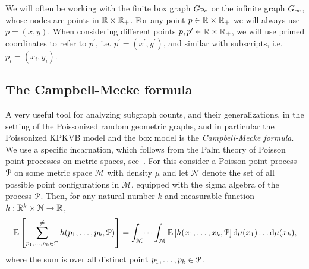 \begin{remark}
We will often be working with the finite box graph $G_{{\mathrm{Po}}}$ or the infinite graph $G_{\infty}$, whose nodes are points in ${\mathbb R} \times {\ensuremath{\mathbb R}}_+$. For any point $p \in {\ensuremath{\mathbb R}} \times {\ensuremath{\mathbb R}}_+$ we will always use $p = (x,y)$. When considering different points $p,p^\prime \in {\ensuremath{\mathbb R}} \times {\ensuremath{\mathbb R}}_+$, we will use primed coordinates to refer to $p^\prime$, i.e. $p^\prime = (x^\prime ,y^\prime)$, and similar with subscripts, i.e. $p_i = (x_i,y_i)$.
\end{remark}

\subsection{The Campbell-Mecke formula}

A very useful tool for analyzing subgraph counts, and their generalizations, in the 
setting of the Poissonized random geometric graphs, and in particular the Poissonized KPKVB model and the box model is the \emph{Campbell-Mecke formula}. We use a specific incarnation, which follows from the Palm theory of Poisson point processes on metric spaces, see~\cite{last2017lectures}. For this consider a Poisson point process ${\mathcal P}$ on some metric space $\mathcal{M}$ with density $\mu$ and let $\mathcal{N}$ denote the set of all possible point configurations in $\mathcal{M}$, equipped with the sigma algebra of the process ${\mathcal P}$. Then, for any natural number $k$ and measurable function $h : {\mathbb R}^k \times \mathcal{N} \to {\ensuremath{\mathbb R}}$,
\begin{equation}\label{eq:def_campbell_mecke}
	\mathbb{E}\left[\sum_{p_1, \dots, p_k \in {\mathcal P}}^{\ne} h(p_1, \dots, p_k, {\mathcal P})\right]
	= \int_{\mathcal{M}} \dots \int_{\mathcal{M}} \mathbb{E}\left[h(x_1,\dots, x_k, {\mathcal P}\right] \operatorname{\mathrm{d}\hspace{-2pt}} \mu(x_1) \dots \operatorname{\mathrm{d}\hspace{-2pt}} \mu(x_k),
\end{equation}
where the sum is over all distinct point $p_1, \dots, p_k \in {\mathcal P}$. 

 
